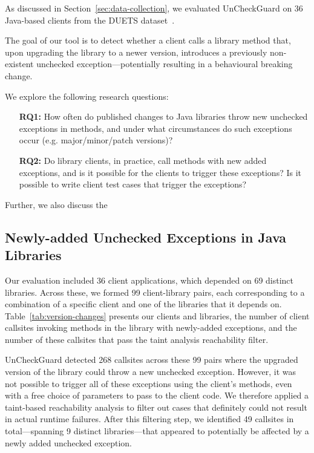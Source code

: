 As discussed in Section~\ref{sec:data-collection}, we evaluated UnCheckGuard on 36 Java-based clients from the DUETS dataset~\cite{durieux21:_duets}.

The goal of our tool is to detect whether a client calls a library method that, upon upgrading the library to a newer version, introduces a previously non-existent unchecked exception—potentially resulting in a behavioural breaking change.

We explore the following research questions:

\begin{itemize}
  \item[\textbf{RQ1:}] How often do published changes to Java libraries throw new unchecked exceptions in methods,
and under what circumstances do such exceptions occur (e.g. major/minor/patch versions)?
  \item[\textbf{RQ2:}]  Do library clients, in practice, call methods with new added exceptions, and is it possible for the clients to trigger these exceptions? Is it possible to write client test cases that trigger the exceptions?
\end{itemize}


Further, we also discuss the 

\subsection{Newly-added Unchecked Exceptions in Java Libraries}

Our evaluation included 36 client applications, which depended on 69 distinct libraries. Across these, we formed 99 client-library pairs, each corresponding to a combination of a specific client and one of the libraries that it depends on. Table~\ref{tab:version-changes} presents our clients and libraries, the number of client callsites invoking methods in the library with newly-added exceptions, and the number of these callsites that pass the taint analysis reachability filter.

UnCheckGuard detected 268 callsites across these 99 pairs where the upgraded version of the library could throw a new unchecked exception. However, it was not possible to trigger all of these exceptions using the client's methods, even with a free choice of parameters to pass to the client code. We therefore applied a taint-based reachability analysis to filter out cases that definitely could not result in actual runtime failures. After this filtering step, we identified 49 callsites in total—spanning 9 distinct libraries—that appeared to potentially be affected by a newly added unchecked exception.


